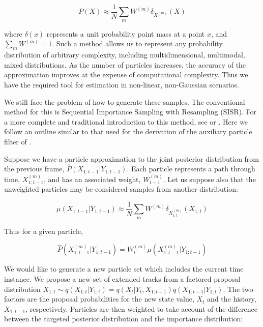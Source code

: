 \begin{equation}
P(X) \approx \frac{1}{N} \sum_m{W^{(m)} \delta_{X^{(m)}} (X)}
\label{eq:ParticleApprox}
\end{equation}

where $\delta (x)$ represents a unit probability point mass at a point $x$, and $\sum_m{W^{(m)}}=1$. Such a method allows us to represent any probability distribution of arbitrary complexity, including multidimensional, multimodal, mixed distributions. As the number of particles increases, the accuracy of the approximation improves at the expense of computational complexity. Thus we have the required tool for estimation in non-linear, non-Gaussian scenarios.

We still face the problem of how to generate these samples. The conventional method for this is Sequential Importance Sampling with Resampling (SISR). For a more complete and traditional introduction to this method, see \cite{Cappe2007} or \cite{Doucet2009}. Here we follow an outline similar to that used for the derivation of the auxiliary particle filter of \cite{Pitt1999}.

Suppose we have a particle approximation to the joint posterior distribution from the previous frame, $\hat{P}(X_{1:t-1}|Y_{1:t-1})$. Each particle represents a path through time, $X_{1:t-1}^{(m)}$, and has an associated weight, $W_{t-1}^{(m)}$. Let us suppose also that the unweighted particles may be considered samples from another distribution:

\begin{equation}
\mu(X_{1:t-1}|Y_{1:t-1}) \approx \frac{1}{N} \sum_m{W^{(m)} \delta_{X_{1:t}^{(m)}} (X_{1:t})}
\label{eq:UnweightParticleDistn}
\end{equation}

Thus for a given particle,

\begin{equation}
\hat{P}(X_{1:t-1}^{(m)}|Y_{1:t-1}) = W_t^{(m)} \mu(X_{1:t-1}^{(m)}|Y_{1:t-1})
\label{eq:}
\end{equation}

We would like to generate a new particle set which includes the current time instance. We propose a new set of extended tracks from a factored proposal distribution $X_{1:t} \sim q(X_{1:t}|Y_{1:t}) = q(X_{t}|Y_{t}, X_{1:t-1}) q(X_{1:t-1}|Y_{1:t})$. The two factors are the proposal probabilities for the new state value, $X_t$ and the history, $X_{1:t-1}$, respectively. Particles are then weighted to take account of the difference between the targeted posterior distribution and the importance distribution:

